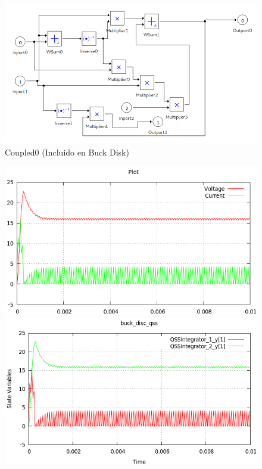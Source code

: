 \documentclass[a4paper,	11pt]{report}
\begin{document}
\begin{figure}[H]
\includegraphics[width=0.75\linewidth]{buck_disk_coupled0}
\caption{Coupled0 (Incluido en Buck Disk)}
\end{figure}

\begin{figure}[H]
\centering
\begin{minipage}{0.5\textwidth}
\centering
 \includegraphics[width=\linewidth]{buck_disk-pd}
\end{minipage}\hfill
\begin{minipage}{0.5\textwidth}
\centering
 \includegraphics[width=\linewidth]{buck_disk-qss}
\end{minipage}
\end{figure}
\end{document}
